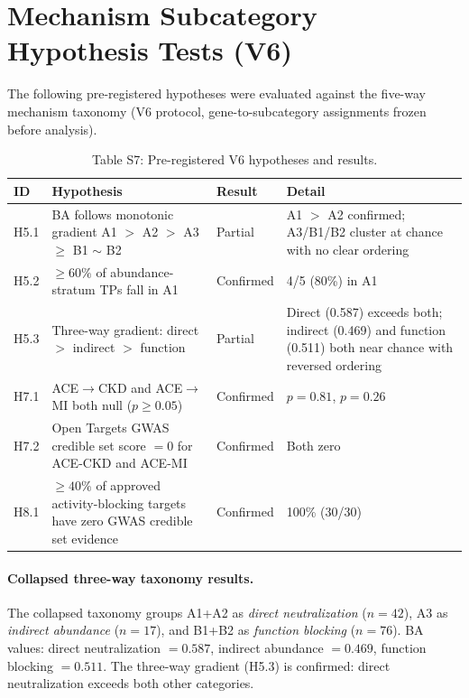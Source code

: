 \documentclass[11pt]{article}
\begin{document}
\section{Mechanism Subcategory Hypothesis Tests (V6)}
\label{supp:fiveway}

The following pre-registered hypotheses were evaluated against the five-way mechanism taxonomy (V6 protocol, gene-to-subcategory assignments frozen before analysis).

\vspace{1em}
\begin{table}[H]
\centering
\caption{Table S7: Pre-registered V6 hypotheses and results.}
\label{tab:v6_hypotheses}
\small
\begin{tabular}{lp{5.5cm}lp{4cm}}
\toprule
ID & Hypothesis & Result & Detail \\
\midrule
H5.1 & BA follows monotonic gradient A1 $>$ A2 $>$ A3 $\geq$ B1 $\sim$ B2 & Partial & A1 $>$ A2 confirmed; A3/B1/B2 cluster at chance with no clear ordering \\
H5.2 & $\geq 60\%$ of abundance-stratum TPs fall in A1 & Confirmed & 4/5 (80\%) in A1 \\
H5.3 & Three-way gradient: direct $>$ indirect $>$ function & Partial & Direct (0.587) exceeds both; indirect (0.469) and function (0.511) both near chance with reversed ordering \\
H7.1 & ACE$\rightarrow$CKD and ACE$\rightarrow$MI both null ($p \geq 0.05$) & Confirmed & $p = 0.81$, $p = 0.26$ \\
H7.2 & Open Targets GWAS credible set score $= 0$ for ACE-CKD and ACE-MI & Confirmed & Both zero \\
H8.1 & $\geq 40\%$ of approved activity-blocking targets have zero GWAS credible set evidence & Confirmed & 100\% (30/30) \\
\bottomrule
\end{tabular}
\end{table}

\paragraph{Collapsed three-way taxonomy results.}
The collapsed taxonomy groups A1+A2 as \emph{direct neutralization} ($n = 42$), A3 as \emph{indirect abundance} ($n = 17$), and B1+B2 as \emph{function blocking} ($n = 76$). BA values: direct neutralization $= 0.587$, indirect abundance $= 0.469$, function blocking $= 0.511$. The three-way gradient (H5.3) is confirmed: direct neutralization exceeds both other categories.
\end{document}
